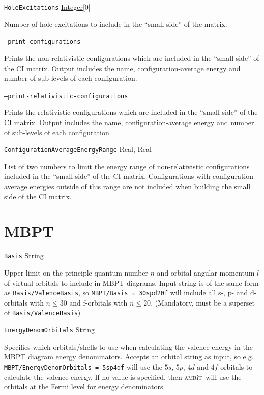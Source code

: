 \documentclass{report}
\newcommand{\ambit}{\textsc{amb}{\footnotesize i}\textsc{t}}
\begin{document}
\texttt{HoleExcitations} \uline{Integer}[0]
\begin{adjustwidth}{1cm}{}
Number of hole excitations to include in the ``small side'' of the matrix.
\end{adjustwidth}

\texttt{--print-configurations}
\begin{adjustwidth}{1cm}{}
Prints the non-relativistic configurations which are included in the ``small side'' of the CI matrix.
Output includes the name, configuration-average energy and number of sub-levels of each configuration.
\end{adjustwidth}

\texttt{--print-relativistic-configurations}
\begin{adjustwidth}{1cm}{}
Prints the relativistic configurations which are included in the ``small side'' of the CI matrix.
Output includes the name, configuration-average energy and number of sub-levels of each configuration.
\end{adjustwidth}

\texttt{ConfigurationAverageEnergyRange} \uline{Real, Real}
\begin{adjustwidth}{1cm}{}
List of two numbers to limit the energy range of non-relativistic configurations included in the ``small
side'' of the CI matrix.
Configurations with configuration average energies outside of this range are not included when building
the small side of the CI matrix.
\end{adjustwidth}

\section{MBPT}

\texttt{Basis} \uline{String}
\begin{adjustwidth}{1cm}{}
Upper limit on the principle quantum number $n$ and orbital angular momentum $l$ of
virtual orbitals to include in MBPT diagrams. Input string is of the same form as
\texttt{Basis/ValenceBasis}, so \texttt{MBPT/Basis = 30spd20f} will include all s-, p- and d-orbitals
with $n \leq 30$ and f-orbitals with $n \leq 20$. (Mandatory, must be a superset of
\texttt{Basis/ValenceBasis})
\end{adjustwidth}

\texttt{EnergyDenomOrbitals} \uline{String}
\begin{adjustwidth}{1cm}{}
Specifies which orbitals/shells to use when calculating the valence energy
in the MBPT diagram energy denominators. Accepts an orbital string as input, so e.g. 
\texttt{MBPT/EnergyDenomOrbitals = 5sp4df} will use the $5s$, $5p$, $4d$ and $4f$ orbitals to calculate
the valence energy. If no value is specified, then \ambit\ will use the orbitals at the Fermi level for
energy denominators.
\end{adjustwidth}
\end{document}
